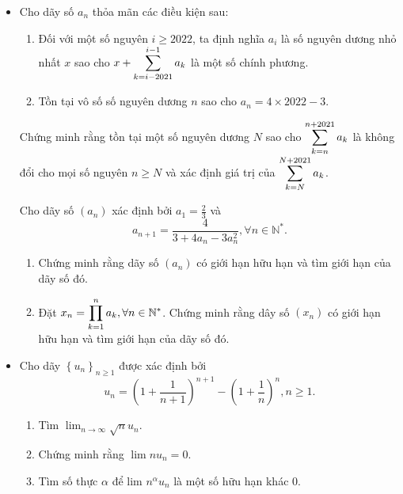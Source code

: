 \documentclass[11pt]{scrartcl}
\begin{document}
\begin{itemize}[label=, leftmargin=0em, itemsep=-0em]
\begin{btvn}
    \end{btvn}
    \item \begin{btvn}
        Cho dãy số ${a_n}$ thỏa mãn các điều kiện sau:
        \begin{enumerate}[label=(\alph*)]
            \item Đối với một số nguyên $i \geq 2022$, ta định nghĩa $a_i$ là số nguyên dương nhỏ nhất $x$ sao cho $x+\displaystyle\sum_{k=i-2021}^{i-1}a_k$ là một số chính phương.
            \item Tồn tại vô số số nguyên dương $n$ sao cho $a_n=4\times 2022-3$.
        \end{enumerate}
        Chứng minh rằng tồn tại một số nguyên dương $N$ sao cho $\displaystyle\sum_{k=n}^{n+2021}a_k$ là không đổi cho mọi số nguyên $n \geq N$ và xác định giá trị của $\displaystyle\sum_{k=N}^{N+2021}a_k$.
    \end{btvn}
    \begin{btvn}
        Cho dãy số $\left(a_n\right)$ xác định bởi $a_1=\frac{2}{3}$ và
        $$
        a_{n+1}=\frac{4}{3+4 a_n-3 a_n^2}, \forall n \in \mathbb{N}^* .
        $$
        \begin{enumerate}
            \item Chứng minh rằng dãy số $\left(a_n\right)$ có giới hạn hữu hạn và tìm giới hạn của dãy số đó.
            \item Đặt $x_n=\displaystyle\prod_{k=1}^n a_k, \forall n \in \mathbb{N}^*$. Chứng minh rằng dây số $\left(x_n\right)$ có giới hạn hữu hạn và tìm giới hạn của dãy số đó.
        \end{enumerate}
    \end{btvn}
    \item\begin{btvn}
        Cho dãy $\left\{u_n\right\}_{n \geq 1}$ được xác định bởi
        $$
        u_n=\left(1+\frac{1}{n+1}\right)^{n+1}-\left(1+\frac{1}{n}\right)^n, n \geq 1 .
        $$
        \begin{enumerate}[label=(\alph*)]
            \item Tìm $\displaystyle \lim _{n \rightarrow \infty} \sqrt{n} u_n$.
            \item Chứng minh rằng $\lim n u_n=0$.
            \item Tìm số thực $\alpha$ để lim $n^\alpha u_n$ là một số hữu hạn khác 0.
        \end{enumerate}

\end{btvn}
\end{itemize}
\end{document}
